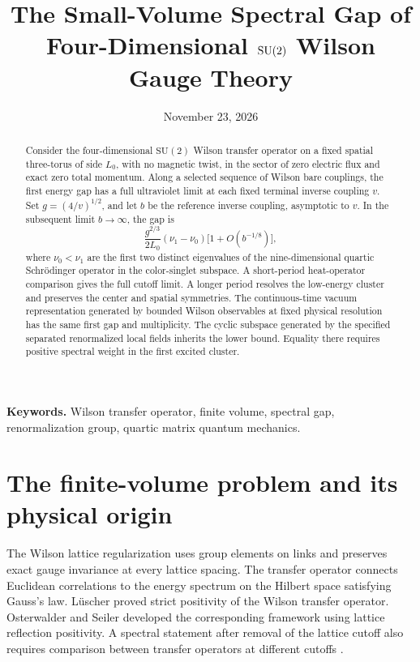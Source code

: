 \documentclass[11pt,a4paper]{article}
\title{The Small-Volume Spectral Gap of Four-Dimensional \texorpdfstring{\(\SU(2)\)}{SU(2)} Wilson Gauge Theory}
\author{}
\date{November 23, 2026}
\makeatletter
\numberwithin{equation}{section}
\newcommand{\SU}{\mathrm{SU}}
\newcommand{\articlecontents}{%
  \begingroup\small
  \setlength{\parskip}{0pt}%
  \renewcommand{\l@section}{\@dottedtocline{1}{0pt}{1.8em}}%
  \tableofcontents
  \endgroup
}
\makeatother
\begin{document}
\maketitle
\begin{abstract}
Consider the four-dimensional \(\SU(2)\) Wilson transfer operator on a fixed spatial three-torus of side \(L_0\), with no magnetic twist, in the sector of zero electric flux and exact zero total momentum. Along a selected sequence of Wilson bare couplings, the first energy gap has a full ultraviolet limit at each fixed terminal inverse coupling \(v\). Set \(g=(4/v)^{1/2}\), and let \(b\) be the reference inverse coupling, asymptotic to \(v\). In the subsequent limit \(b\to\infty\), the gap is
\[
 \frac{g^{2/3}}{2L_0}(\nu_1-\nu_0)\bigl[1+O(b^{-1/8})\bigr],
\]
where \(\nu_0<\nu_1\) are the first two distinct eigenvalues of the nine-dimensional quartic Schr\"odinger operator in the color-singlet subspace. A short-period heat-operator comparison gives the full cutoff limit. A longer period resolves the low-energy cluster and preserves the center and spatial symmetries. The continuous-time vacuum representation generated by bounded Wilson observables at fixed physical resolution has the same first gap and multiplicity. The cyclic subspace generated by the specified separated renormalized local fields inherits the lower bound. Equality there requires positive spectral weight in the first excited cluster.
\end{abstract}

\noindent\textbf{Keywords.} Wilson transfer operator, finite volume, spectral gap, renormalization group, quartic matrix quantum mechanics.

\articlecontents

\section{The finite-volume problem and its physical origin}

The Wilson lattice regularization uses group elements on links and preserves exact gauge invariance at every lattice spacing. The transfer operator connects Euclidean correlations to the energy spectrum on the Hilbert space satisfying Gauss's law. L\"uscher proved strict positivity of the Wilson transfer operator. Osterwalder and Seiler developed the corresponding framework using lattice reflection positivity. A spectral statement after removal of the lattice cutoff also requires comparison between transfer operators at different cutoffs \cite{wilson,luscher-transfer,osterwalder-seiler}.
\end{document}
